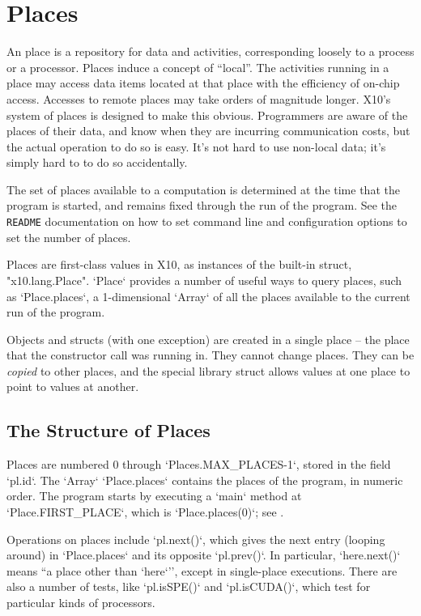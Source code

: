 
\chapter{Places}
\label{XtenPlaces}

An \Xten{} place is a repository for data and activities, corresponding
loosely to a process or a processor. Places induce a concept of ``local''. The
activities running in a place may access data items located at that place with
the efficiency of on-chip access. Accesses to remote places may take orders of
magnitude longer. X10's system of places is designed to make this obvious.
Programmers are aware of the places of their data, and know when they are
incurring communication costs, but the actual operation to do so is easy. It's
not hard to use non-local data; it's simply hard to to do so accidentally.

The set of places available to a computation is determined at the time that
the program is started, and remains fixed through the run of the program. See
the {\tt README} documentation on how to set command line and configuration
options to set the number of places.

Places are first-class values in X10, as instances of the built-in struct,
\xcd"x10.lang.Place".   \xcd`Place` provides a number of useful ways to
query places, such as \xcd`Place.places`, a 1-dimensional \xcd`Array` of all
the places
available to the current run of the program.

Objects and structs (with one exception) are created in a single place -- the
place that the constructor call was running in. They cannot change places.
They can be {\em copied} to other places, and the special library struct
 allows values at one place to point to values at another.  

\section{The Structure of Places}

Places are numbered 0 through \xcd`Places.MAX_PLACES-1`, stored in the field
\xcd`pl.id`.  The \xcd`Array` \xcd`Place.places` contains the places of the
program, in numeric order. 
The program starts by executing a \xcd`main` method at
\xcd`Place.FIRST_PLACE`, which is \xcd`Place.places(0)`; see
. 

Operations on places include \xcd`pl.next()`, which gives the next entry
(looping around) in \xcd`Place.places` and its opposite \xcd`pl.prev()`. In
particular, \xcd`here.next()` means ``a place other than \xcd`here`'', except
in single-place executions.
There are also a number of tests, like \xcd`pl.isSPE()` and 
\xcd`pl.isCUDA()`, which test for particular kinds of processors.




